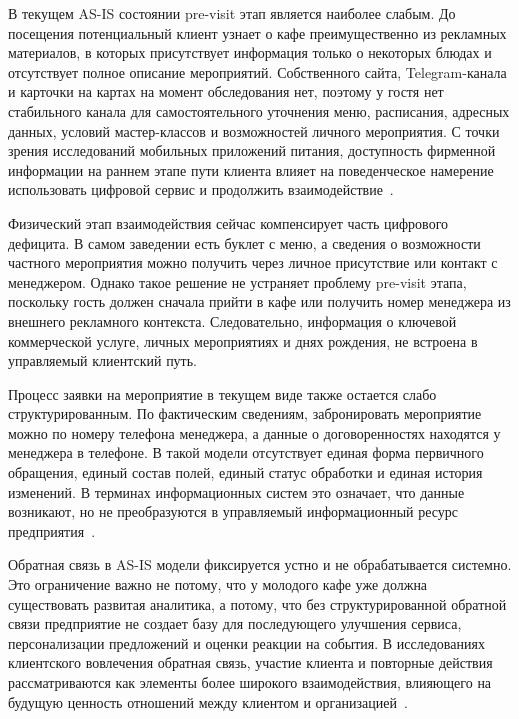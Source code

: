 В текущем AS-IS состоянии pre-visit этап является наиболее слабым. До посещения потенциальный клиент узнает о кафе преимущественно из рекламных материалов, в которых присутствует информация только о некоторых блюдах и отсутствует полное описание мероприятий. Собственного сайта, Telegram-канала и карточки на картах на момент обследования нет, поэтому у гостя нет стабильного канала для самостоятельного уточнения меню, расписания, адресных данных, условий мастер-классов и возможностей личного мероприятия. С точки зрения исследований мобильных приложений питания, доступность фирменной информации на раннем этапе пути клиента влияет на поведенческое намерение использовать цифровой сервис и продолжить взаимодействие~\cite{rita2022}.

Физический этап взаимодействия сейчас компенсирует часть цифрового дефицита. В самом заведении есть буклет с меню, а сведения о возможности частного мероприятия можно получить через личное присутствие или контакт с менеджером. Однако такое решение не устраняет проблему pre-visit этапа, поскольку гость должен сначала прийти в кафе или получить номер менеджера из внешнего рекламного контекста. Следовательно, информация о ключевой коммерческой услуге, личных мероприятиях и днях рождения, не встроена в управляемый клиентский путь.

Процесс заявки на мероприятие в текущем виде также остается слабо структурированным. По фактическим сведениям, забронировать мероприятие можно по номеру телефона менеджера, а данные о договоренностях находятся у менеджера в телефоне. В такой модели отсутствует единая форма первичного обращения, единый состав полей, единый статус обработки и единая история изменений. В терминах информационных систем это означает, что данные возникают, но не преобразуются в управляемый информационный ресурс предприятия~\cite{utkin_baldin_2003,gost34003}.

Обратная связь в AS-IS модели фиксируется устно и не обрабатывается системно. Это ограничение важно не потому, что у молодого кафе уже должна существовать развитая аналитика, а потому, что без структурированной обратной связи предприятие не создает базу для последующего улучшения сервиса, персонализации предложений и оценки реакции на события. В исследованиях клиентского вовлечения обратная связь, участие клиента и повторные действия рассматриваются как элементы более широкого взаимодействия, влияющего на будущую ценность отношений между клиентом и организацией~\cite{pansari2017,behnam2021,chathoth2016}.

